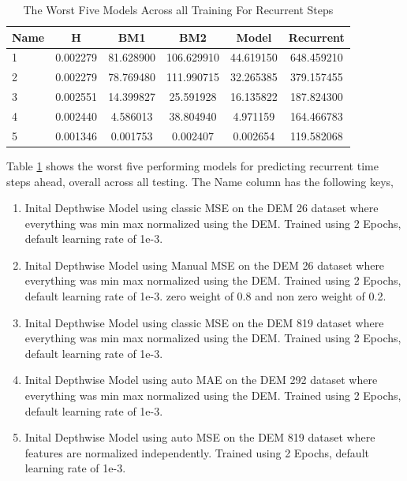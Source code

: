 \begin{table}[htbp]
	\centering
	\caption{The Worst Five Models Across all Training For Recurrent Steps}
	\label{tab:worstr}
	\begin{tabular}{p{2cm}ccccc}
		\toprule
		Name &  H &  BM1 &  BM2 &  Model &  Recurrent \\
		\midrule
		1 &       0.002279 &       81.628900 &      106.629910 &  44.619150 &          648.459210 \\
		2 &       0.002279 &       78.769480 &      111.990715 &  32.265385 &          379.157455 \\
		3 &       0.002551 &       14.399827 &       25.591928 &  16.135822 &          187.824300 \\
		4 &       0.002440 &        4.586013 &       38.804940 &   4.971159 &          164.466783 \\
		5 &       0.001346 &        0.001753 &        0.002407 &   0.002654 &          119.582068 \\
		\bottomrule
	\end{tabular}
\end{table}

Table \ref{tab:worstr} shows the worst five performing models for predicting recurrent time steps ahead, overall across all testing. The Name column has the following keys,
\begin{enumerate}
	\item Inital Depthwise Model using classic MSE on the DEM 26 dataset where everything was min max normalized using the DEM. Trained using 2 Epochs, default learning rate of 1e-3.
	\item Inital Depthwise Model using Manual MSE on the DEM 26 dataset where everything was min max normalized using the DEM. Trained using 2 Epochs, default learning rate of 1e-3. zero weight of 0.8 and non zero weight of 0.2.
	\item Inital Depthwise Model using classic MSE on the DEM 819 dataset where everything was min max normalized using the DEM. Trained using 2 Epochs, default learning rate of 1e-3.
	\item Inital Depthwise Model using  auto MAE on the DEM 292 dataset where everything was min max normalized using the DEM. Trained using 2 Epochs, default learning rate of 1e-3.
	\item Inital Depthwise Model using  auto MSE on the DEM 819 dataset where features are normalized independently. Trained using 2 Epochs, default learning rate of 1e-3.
\end{enumerate}

